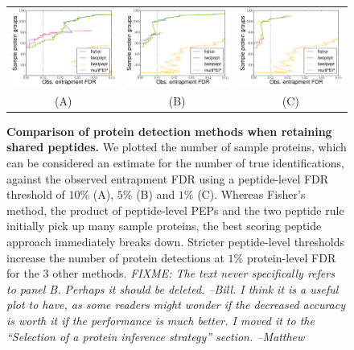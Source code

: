 \documentclass{article}
\begin{document}
\begin{figure}
\begin{center}
\begin{tabular}{ccc} 
\includegraphics[width=0.3\linewidth]
  {./img/shared-pept-performance-fdr10} &
\includegraphics[width=0.3\linewidth]
  {./img/shared-pept-performance-fdr5} &
\includegraphics[width=0.3\linewidth]
  {./img/shared-pept-performance-fdr1}\\
(A) & (B) & (C)
\end{tabular}
\caption{\label{fig:shared-performance}\textbf{Comparison of protein 
detection methods when retaining shared peptides.} We plotted the 
number of sample proteins, which can be considered an estimate for the 
number of true identifications, against the observed entrapment FDR 
using a peptide-level FDR threshold of $10\%$ (A), $5\%$ (B) and $1\%$ 
(C). Whereas Fisher's method, the product of peptide-level PEPs and 
the two peptide rule initially pick up many sample proteins, the best 
scoring peptide approach immediately breaks down. Stricter 
peptide-level thresholds increase the number of protein detections at 
$1\%$ protein-level FDR for the $3$ other methods. {\em FIXME: The 
text never specifically refers to panel B.  Perhaps it should be 
deleted.  --Bill. I think it is a useful plot to have, as some readers 
might wonder if the decreased accuracy is worth it if the performance 
is much better. I moved it to the ``Selection of a protein inference 
strategy'' section. --Matthew}}
\end{center}
\end{figure}
\end{document}
